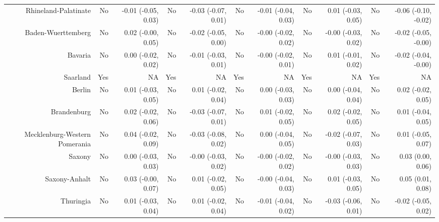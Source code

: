 \documentclass[
  man,floatsintext]{apa6}
\newenvironment{lltable}{\begin{landscape}\centering\begin{ThreePartTable}}{\end{ThreePartTable}\end{landscape}}
\begin{document}
\begin{lltable}
{\begin{longtable}{rrrrrrrrrrr}
Rhineland-Palatinate & No & -0.01 (-0.05, 0.03) & No & -0.03 (-0.07, 0.01) & No & -0.01 (-0.04, 0.03) & No & 0.01 (-0.03, 0.05) & No & -0.06 (-0.10, -0.02)\\
Baden-Wuerttemberg & No & 0.02 (-0.00, 0.05) & No & -0.02 (-0.05, 0.00) & No & -0.00 (-0.02, 0.02) & No & -0.00 (-0.03, 0.02) & No & -0.02 (-0.05, -0.00)\\
Bavaria & No & 0.00 (-0.02, 0.02) & No & -0.01 (-0.03, 0.01) & No & -0.00 (-0.02, 0.01) & No & 0.01 (-0.01, 0.02) & No & -0.02 (-0.04, -0.00)\\
Saarland & Yes & NA & Yes & NA & Yes & NA & Yes & NA & Yes & NA\\
Berlin & No & 0.01 (-0.03, 0.05) & No & 0.01 (-0.02, 0.04) & No & 0.00 (-0.03, 0.03) & No & 0.00 (-0.04, 0.04) & No & 0.02 (-0.02, 0.05)\\
Brandenburg & No & 0.02 (-0.02, 0.06) & No & -0.03 (-0.07, 0.01) & No & 0.01 (-0.02, 0.05) & No & 0.02 (-0.02, 0.05) & No & 0.01 (-0.04, 0.05)\\
Mecklenburg-Western Pomerania & No & 0.04 (-0.02, 0.09) & No & -0.03 (-0.08, 0.02) & No & 0.00 (-0.04, 0.05) & No & -0.02 (-0.07, 0.03) & No & 0.01 (-0.05, 0.07)\\
Saxony & No & 0.00 (-0.03, 0.03) & No & -0.00 (-0.03, 0.02) & No & -0.00 (-0.02, 0.02) & No & -0.00 (-0.03, 0.03) & No & 0.03 (0.00, 0.06)\\
Saxony-Anhalt & No & 0.03 (-0.00, 0.07) & No & 0.01 (-0.02, 0.05) & No & -0.00 (-0.04, 0.03) & No & 0.01 (-0.03, 0.05) & No & 0.05 (0.01, 0.08)\\
Thuringia & No & 0.01 (-0.03, 0.04) & No & 0.01 (-0.02, 0.04) & No & -0.01 (-0.04, 0.02) & No & -0.03 (-0.06, 0.01) & No & -0.02 (-0.05, 0.02)\\
\bottomrule
\end{longtable}

}

\end{lltable}
\end{document}
